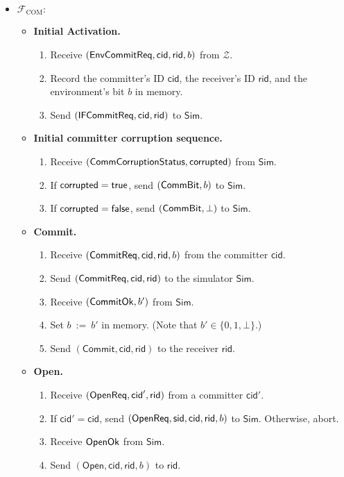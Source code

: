 \documentclass[11pt,letterpaper]{article}
\theoremstyle{plain} %
\theoremstyle{definition} %
\theoremstyle{remark} %
\newcommand{\eqdef}{\ {:=} \ }
\newcommand{\OpenMsg}{\mathsf{Open}}
\newcommand{\CommitMsg}{\mathsf{Commit}}
\newcommand{\Simulator}{{\mathsf{Sim}}} %
\newcommand{\Environment}{{\mathcal{Z}}} %
\newcommand{\IF}{\mathcal{F}} %
\newcommand{\sid}{\mathsf{sid}}
\newcommand{\CommitterId}{\mathsf{cid}}
\newcommand{\ReceiverId}{\mathsf{rid}}
\newcommand{\True}{\mathsf{true}}
\newcommand{\False}{\mathsf{false}}
\newcommand{\IFCom}{\IF_{\mathrm{COM}}}
\newcommand{\CommBit}{b}
\begin{document}
\begin{mdframed}
\begin{itemize}
\item[]$\IFCom:$
\begin{itemize}
\item \textbf{Initial Activation.}
\begin{enumerate}[nolistsep]
\item Receive $(\EnvCommitReqMsg, \CommitterId, \ReceiverId, \CommBit)$ from $\Environment$.
\item Record the committer's ID $\CommitterId$, the receiver's ID $\ReceiverId$, and the environment's bit $\CommBit$ in memory.
\item Send $(\IFCommitReqMsg, \CommitterId,\ReceiverId)$ to $\Simulator$.
\end{enumerate}

\item \textbf{Initial committer corruption sequence.}
\begin{enumerate}[nolistsep]
\item Receive $(\mathsf{CommCorruptionStatus}, \mathsf{corrupted})$ from $\Simulator$.
\item If $\CommCorruptedBit = \True$, send $(\CommBitMsg, \CommBit)$ to $\Simulator$.
\item If $\CommCorruptedBit = \False$, send $(\mathsf{CommBit}, \bot)$ to $\Simulator$.
\end{enumerate}

\item \textbf{Commit.}
\begin{enumerate}[nolistsep]
\item Receive $(\CommitReq, \CommitterId, \ReceiverId, \CommBit)$ from the committer $\CommitterId$.
\item Send $(\CommitReq, \CommitterId, \ReceiverId)$ to the simulator $\Simulator$.
\item Receive $(\CommitOkMsg,\CommBit')$ from $\Simulator$.
\item Set $\CommBit \eqdef \CommBit'$ in memory. (Note that $\CommBit' \in \{0,1,\bot\}$.)
\item Send $(\CommitMsg, \CommitterId, \ReceiverId)$ to the receiver $\ReceiverId$.
\end{enumerate}

\item \textbf{Open.}
\begin{enumerate}[nolistsep]
\item Receive $(\OpenReq, \CommitterId', \ReceiverId)$ from a committer $\CommitterId'$.
\item If $\CommitterId' = \CommitterId$, send $(\OpenReq, \sid, \CommitterId, \ReceiverId, \CommBit)$ to $\Simulator$. Otherwise, abort.
\item Receive $\mathsf{OpenOk}$ from $\Simulator$.
\item Send $(\OpenMsg, \CommitterId, \ReceiverId, \CommBit)$ to $\ReceiverId$.
\end{enumerate}


\end{itemize}
\end{itemize}
\end{mdframed}
\end{document}
